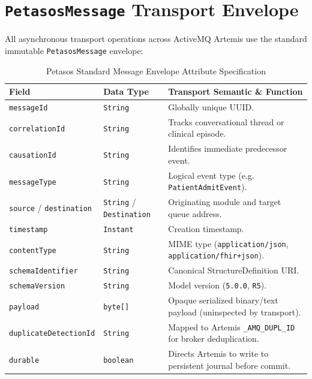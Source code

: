 \section{\texttt{PetasosMessage} Transport Envelope}

All asynchronous transport operations across ActiveMQ Artemis use the standard immutable \texttt{PetasosMessage} envelope:

\begin{table}[htbp]
\centering
\small
\begin{tabularx}{\textwidth}{l l X}
\toprule
\textbf{Field} & \textbf{Data Type} & \textbf{Transport Semantic \& Function} \\
\midrule
\texttt{messageId} & \texttt{String} & Globally unique UUID. \\
\texttt{correlationId} & \texttt{String} & Tracks conversational thread or clinical episode. \\
\texttt{causationId} & \texttt{String} & Identifies immediate predecessor event. \\
\texttt{messageType} & \texttt{String} & Logical event type (e.g. \texttt{PatientAdmitEvent}). \\
\texttt{source} / \texttt{destination} & \texttt{String} / \texttt{Destination} & Originating module and target queue address. \\
\texttt{timestamp} & \texttt{Instant} & Creation timestamp. \\
\texttt{contentType} & \texttt{String} & MIME type (\texttt{application/json}, \texttt{application/fhir+json}). \\
\texttt{schemaIdentifier} & \texttt{String} & Canonical StructureDefinition URI. \\
\texttt{schemaVersion} & \texttt{String} & Model version (\texttt{5.0.0}, \texttt{R5}). \\
\texttt{payload} & \texttt{byte[]} & Opaque serialized binary/text payload (uninspected by transport). \\
\texttt{duplicateDetectionId}& \texttt{String} & Mapped to Artemis \texttt{\_AMQ\_DUPL\_ID} for broker deduplication. \\
\texttt{durable} & \texttt{boolean} & Directs Artemis to write to persistent journal before commit. \\
\bottomrule
\end{tabularx}
\caption{Petasos Standard Message Envelope Attribute Specification}
\label{tab:petasos_envelope}
\end{table}

